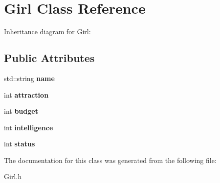 \hypertarget{classGirl}{}\section{Girl Class Reference}
\label{classGirl}


Inheritance diagram for Girl\+:
\subsection*{Public Attributes}
\begin{DoxyCompactItemize}
\item 
std\+::string {\bfseries name}\hypertarget{classGirl_a669015e51c1655dcaa1071787db8eb87}{}\label{classGirl_a669015e51c1655dcaa1071787db8eb87}

\item 
int {\bfseries attraction}\hypertarget{classGirl_afed1ca75917676022cc41daf9c5da3fd}{}\label{classGirl_afed1ca75917676022cc41daf9c5da3fd}

\item 
int {\bfseries budget}\hypertarget{classGirl_ae9b239496b3b58b0a5b79c498d23a3d5}{}\label{classGirl_ae9b239496b3b58b0a5b79c498d23a3d5}

\item 
int {\bfseries intelligence}\hypertarget{classGirl_a751f8b9d8f1ba139d3f512eb198c16f4}{}\label{classGirl_a751f8b9d8f1ba139d3f512eb198c16f4}

\item 
int {\bfseries status}\hypertarget{classGirl_a0d710846b78083cb192a47527ade8e54}{}\label{classGirl_a0d710846b78083cb192a47527ade8e54}

\end{DoxyCompactItemize}


The documentation for this class was generated from the following file\+:\begin{DoxyCompactItemize}
\item 
Girl.\+h\end{DoxyCompactItemize}
